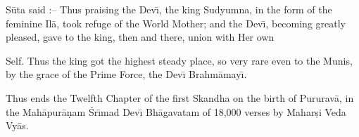 S\=uta said :-- Thus praising the Dev\={\i}, the king Sudyumna, in the form of the feminine Il\=a, took refuge of the World Mother; and the Dev\={\i}, becoming greatly pleased, gave to the king, then and there, union with Her own

Self. Thus the king got the highest steady place, so very rare even to the Munis, by the grace of the Prime Force, the Dev\={\i} Brahm\=amay\={\i}.

Thus ends the Twelfth Chapter of the first Skandha on the birth of Pururav\=a, in the Mah\=apur\=a\d{n}am \'Sr\={\i}mad Dev\={\i} Bh\=agavatam of 18,000 verses by Mahar\d{s}i Veda Vy\=as.



